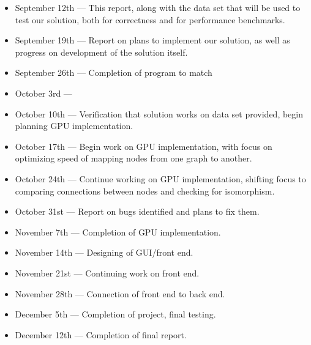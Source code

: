 \documentclass{article}
\begin{document}
\begin{itemize}
  \item September 12th --- This report, along with the data set that will be used to test our solution, both for correctness and for performance benchmarks.
  \item September 19th --- Report on plans to implement our solution, as well as progress on development of the solution itself.
  \item September 26th --- Completion of program to match %
  \item October 3rd --- %
  \item October 10th --- Verification that solution works on data set provided, begin planning GPU implementation.
  \item October 17th --- Begin work on GPU implementation, with focus on optimizing speed of mapping nodes from one graph to another.
  \item October 24th --- Continue working on GPU implementation, shifting focus to comparing connections between nodes and checking for isomorphism.
  \item October 31st --- Report on bugs identified and plans to fix them.
  \item November 7th --- Completion of GPU implementation. 
  \item November 14th --- Designing of GUI/front end.
  \item November 21st --- Continuing work on front end.
  \item November 28th --- Connection of front end to back end.
  \item December 5th --- Completion of project, final testing.
  \item December 12th --- Completion of final report.
\end{itemize}
\end{document}
